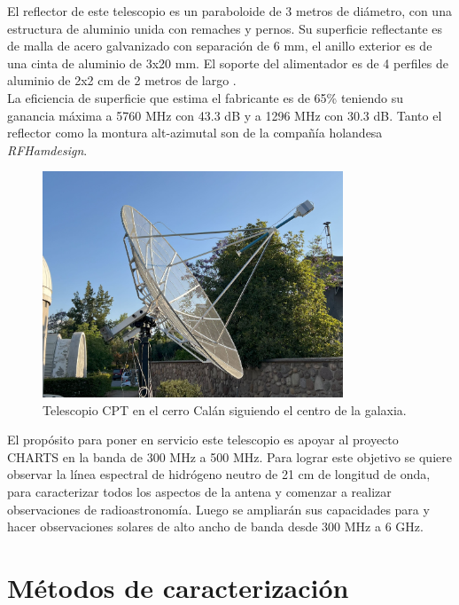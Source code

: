 El reflector de este telescopio es un paraboloide de 3 metros de diámetro, con una estructura de aluminio unida con remaches y pernos. Su superficie reflectante es de malla de acero galvanizado con separación de 6 mm, el anillo exterior es de una cinta de aluminio de 3x20 mm. El soporte del alimentador es de 4 perfiles de aluminio de 2x2 cm de 2 metros de largo \cite{rfhamdesign3meterdish}.\\

La eficiencia de superficie que estima el fabricante es de 65\% teniendo su ganancia máxima a 5760 MHz con 43.3 dB y a 1296 MHz con 30.3 dB. Tanto el reflector como la montura alt-azimutal son de la compañía holandesa \textit{RFHamdesign}.\\

\begin{figure}
    \centering
    \includegraphics[width = 0.8\textwidth]{img/cpt_tracking}
    \caption{Telescopio CPT en el cerro Calán siguiendo el centro de la galaxia.}
    \label{fig:cpt}
\end{figure}

El propósito para poner en servicio este telescopio es apoyar al proyecto CHARTS en la banda de 300 MHz a 500 MHz. Para lograr este objetivo se quiere observar la línea espectral de hidrógeno neutro de 21 cm de longitud de onda, para caracterizar todos los aspectos de la antena y comenzar a realizar observaciones de radioastronomía. Luego se ampliarán sus capacidades para  y hacer observaciones solares de alto ancho de banda desde 300 MHz a 6 GHz.\\

\section{Métodos de caracterización}

